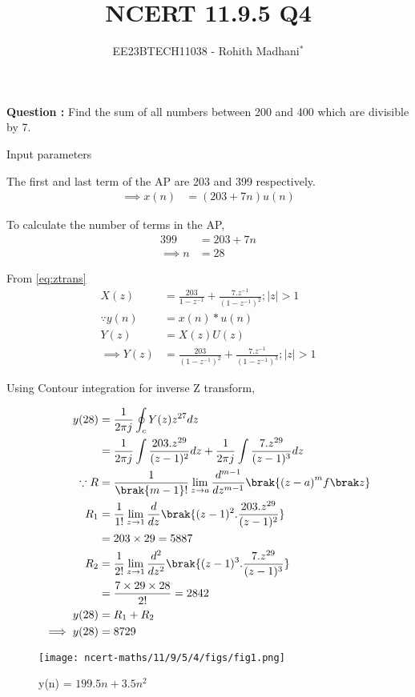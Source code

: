 \documentclass[journal,12pt,twocolumn]{IEEEtran}
\theoremstyle{remark}
\begin{document}

\vspace{3cm}

\title{NCERT 11.9.5 Q4}
\author{EE23BTECH11038 - Rohith Madhani$^{*}$%
}
\maketitle
\newpage
\bigskip
\renewcommand{\thefigure}{\theenumi}
\renewcommand{\thetable}{\theenumi}

\textbf{Question :} Find the sum of all numbers between 200 and 400 which are divisible by 7.\\
\solution 
\fi

\begin{table}[!h] 
\centering

\caption{Input parameters}
\label{table:11.9.5.4}
\end{table}

The first and last term of the AP are 203 and 399 respectively.
\begin{align}
    \implies x(n) &= (203 + 7n)u(n) 
\end{align}

To calculate the number of terms in the AP,
\begin{align}
    399 &= 203 + 7n \\
    \implies n &= 28
\end{align}

From \eqref{eq:ztrans}
\begin{align}
    X(z) &= \frac{203}{1-z^{-1}} + \frac{7.z^{-1}}{(1-z^{-1})^2} ; |z|>1 \\
    \because y(n) &= x(n)*u(n) \\
    Y(z) &= X(z)U(z) \\
    \implies Y(z) &= \frac{203}{(1-z^{-1})^2} + \frac{7.z^{-1}}{(1-z^{-1})^3} ; |z|>1 
\end{align}

Using Contour integration for inverse Z transform,

\begin{align}
    y(28) &= \frac{1}{2\pi j}\oint_c Y(z) z^{27} dz \\
    &= \frac{1}{2\pi j}\int \frac{203.z^{29}}{(z-1)^{2}} dz + \frac{1}{2\pi j}\int \frac{7.z^{29}}{(z-1)^{3}} dz\\
    \because R&=\frac{1}{\brak {m-1}!}\lim\limits_{z\to a}\frac{d^{m-1}}{dz^{m-1}}\brak {{(z-a)}^{m}f\brak z}\\
    R_1 &=\frac{1}{1!}\lim\limits_{z\to 1}\frac{d}{dz}\brak {(z-1)^2.\frac{203.z^{29}}{(z-1)^{2}}}\\
    &= 203 \times 29 = 5887 \\
    R_2 &=\frac{1}{2!}\lim\limits_{z\to 1}\frac{d^2}{dz^2}\brak {(z-1)^3.\frac{7.z^{29}}{(z-1)^{3}}}\\
    &= \frac{7 \times 29 \times 28}{2!} = 2842\\
    y(28) &= R_1 + R_2 \\
    \implies y(28) &= 8729 
\end{align}

\begin{figure}[h]
  \centering
  \texttt{[image: ncert-maths/11/9/5/4/figs/fig1.png]}
  \caption{y(n) = $199.5n + 3.5n^2$}
  \label{fig:11.9.5.4}
\end{figure}
\end{document}
